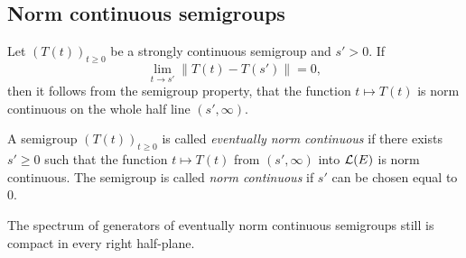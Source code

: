 \subsection{Norm continuous semigroups} \label{subsec:a2-1.se6}%
Let $(T(t))_{t\geq 0}$ be a strongly continuous semigroup and $s' > 0$.
If\/ 
%
\[
	\lim_{t \to s'} \|T(t) - T(s')\| = 0 ,
\]
%
then it follows from the semigroup property, that the function $t \mapsto T(t)$ is norm continuous on the whole half line $(s',\infty)$.

\begin{definition}\label{def:a2-1.19}
A semigroup $(T(t))_{t\geq 0}$ is called \emph{eventually norm continuous} if there exists $s' \geq 0$ such that the function $t \mapsto T(t)$ from $(s',\infty)$ into $\mathcal{L}(E)$ is norm continuous.
The semigroup is called \emph{norm continuous} if\/ $s'$ can be chosen equal to $0$.
\end{definition}

The spectrum of generators of eventually norm continuous semigroups still is compact in every right half-plane.


